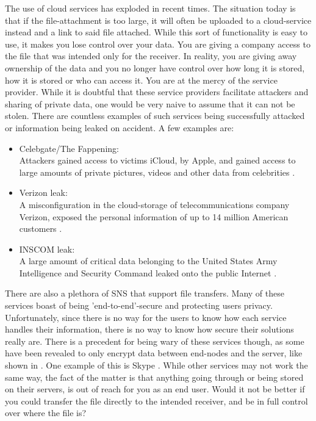The use of cloud services has exploded in recent times. The situation today is that if the file-attachment is too large, it will often be uploaded to a cloud-service instead and a link to said file attached. While this sort of functionality is easy to use, it makes you lose control over your data. You are giving a company access to the file that was intended only for the receiver. In reality, you are giving away ownership of the data and you no longer have control over how long it is stored, how it is stored or who can access it. You are at the mercy of the service provider. While it is doubtful that these service providers facilitate attackers and sharing of private data, one would be very naive to assume that it can not be stolen. There are countless examples of such services being successfully attacked or information being leaked on accident. A few examples are:
\begin{itemize}
	\item Celebgate/The Fappening:\\
	Attackers gained access to victims iCloud, by Apple, and gained access to large amounts of private pictures, videos and other data from celebrities \cite{CelebgateTwoMethodological}.
	\item Verizon leak:\\
	A misconfiguration in the cloud-storage of telecommunications company Verizon, exposed the personal information of up to 14 million American customers \cite{CloudLeakHow}.
	\item INSCOM leak:\\
	A large amount of critical data belonging to the United States Army Intelligence and Security Command leaked onto the public Internet \cite{osullivanBlackBoxRed}.
\end{itemize}

There are also a plethora of SNS that support file transfers. Many of these services boast of being 'end-to-end'-secure and protecting users privacy. Unfortunately, since there is no way for the users to know how each service handles their information, there is no way to know how secure their solutions really are. There is a precedent for being wary of these services though, as some have been revealed to only encrypt data between end-nodes and the server, like shown in .  One example of this is Skype \cite{greenwaldMicrosoftHandedNSA2013,popaSkypeProvidedBackdoor,ItSafeTransfer}. While other services may not work the same way, the fact of the matter is that anything going through or being stored on their servers, is out of reach for you as an end user. Would it not be better if you could transfer the file directly to the intended receiver, and be in full control over where the file is?
%
